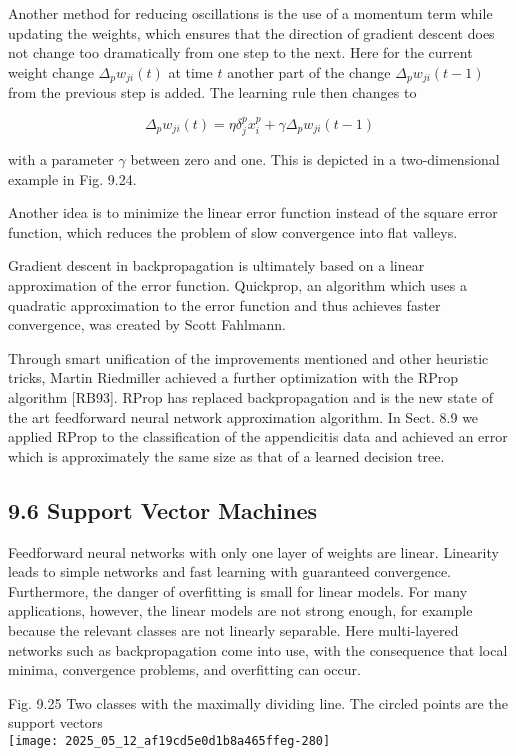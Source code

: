 \documentclass[10pt]{article}
\begin{document}
Another method for reducing oscillations is the use of a momentum term while updating the weights, which ensures that the direction of gradient descent does not change too dramatically from one step to the next. Here for the current weight change $\Delta_{p} w_{j i}(t)$ at time $t$ another part of the change $\Delta_{p} w_{j i}(t-1)$ from the previous step is added. The learning rule then changes to

$$
\Delta_{p} w_{j i}(t)=\eta \delta_{j}^{p} x_{i}^{p}+\gamma \Delta_{p} w_{j i}(t-1)
$$

with a parameter $\gamma$ between zero and one. This is depicted in a two-dimensional example in Fig. 9.24.

Another idea is to minimize the linear error function instead of the square error function, which reduces the problem of slow convergence into flat valleys.

Gradient descent in backpropagation is ultimately based on a linear approximation of the error function. Quickprop, an algorithm which uses a quadratic approximation to the error function and thus achieves faster convergence, was created by Scott Fahlmann.

Through smart unification of the improvements mentioned and other heuristic tricks, Martin Riedmiller achieved a further optimization with the RProp algorithm [RB93]. RProp has replaced backpropagation and is the new state of the art feedforward neural network approximation algorithm. In Sect. 8.9 we applied RProp to the classification of the appendicitis data and achieved an error which is approximately the same size as that of a learned decision tree.

\subsection*{9.6 Support Vector Machines}
Feedforward neural networks with only one layer of weights are linear. Linearity leads to simple networks and fast learning with guaranteed convergence. Furthermore, the danger of overfitting is small for linear models. For many applications, however, the linear models are not strong enough, for example because the relevant classes are not linearly separable. Here multi-layered networks such as backpropagation come into use, with the consequence that local minima, convergence problems, and overfitting can occur.

Fig. 9.25 Two classes with the maximally dividing line. The circled points are the support vectors\\
\texttt{[image: 2025\_05\_12\_af19cd5e0d1b8a465ffeg-280]}
\end{document}
